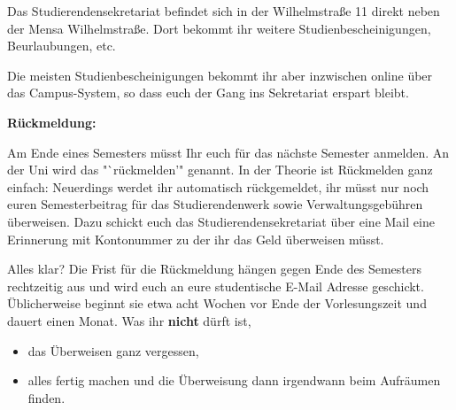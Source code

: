 Das Studierendensekretariat befindet sich in der Wilhelmstraße 11 direkt neben der Mensa Wilhelmstraße.
  Dort bekommt ihr weitere Studienbescheinigungen,
  Beurlaubungen, etc.

Die meisten Studienbescheinigungen bekommt ihr aber inzwischen
   online über das Campus-System, so dass euch der Gang ins Sekretariat erspart bleibt. 

\textbf{Rückmeldung:}

Am Ende eines Semesters müsst Ihr euch für das nächste Semester anmelden.
  An der Uni wird das "`rückmelden'" genannt.
  In der Theorie ist Rückmelden ganz
  einfach: Neuerdings werdet ihr automatisch rückgemeldet, ihr
  müsst nur noch euren Semesterbeitrag für das Studierendenwerk sowie Verwaltungsgebühren überweisen. Dazu schickt euch das Studierendensekretariat über eine Mail eine Erinnerung mit Kontonummer zu der ihr das Geld überweisen müsst. %

Alles klar? Die Frist für die Rückmeldung hängen gegen Ende des
  Semesters rechtzeitig aus und wird euch an eure studentische E-Mail Adresse geschickt.  Üblicherweise beginnt sie etwa acht Wochen
  vor Ende der Vorlesungszeit und dauert einen Monat.
  Was ihr \textbf{nicht} dürft ist,

\begin{itemize}

   \item das Überweisen ganz vergessen,

   \item alles fertig machen und die Überweisung dann irgendwann beim
        Aufräumen finden.

\end{itemize}
